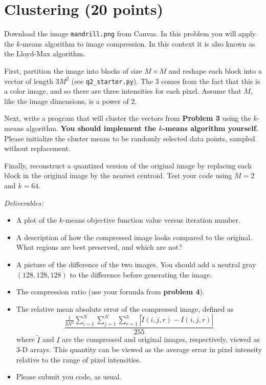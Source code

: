 \section{Clustering (20 points)}

Download the image \texttt{mandrill.png} from Canvas. In this problem you will apply the $k$-means algorithm to image compression. In this context it is also known as the Lloyd-Max algorithm.

\begin{problem}
First, partition the image into blocks of size $M \times M$ and
reshape each block into a vector of length $3M^2$  (see \texttt{q2\_starter.py}). The 3 comes from the fact that this is a color image, and so there are three intensities for each pixel. Assume that $M$, like the image dimensions, is a power of 2.

Next, write a program that will cluster the vectors from \textbf{Problem 3} using the $k$-means algorithm.
\textbf{You should implement the $k$-means algorithm yourself.} Please initialize the cluster means to be randomly selected data points, sampled without replacement.

Finally, reconstruct a quantized version of the original image by
replacing each block in the original image by the nearest centroid. Test your code using $M = 2$ and $k = 64$.

\emph{Deliverables:}
\begin{itemize}
    \item A plot of the $k$-means objective function value versus iteration number.
    \item A description of how the compressed image looks compared to the original. What regions are best preserved, and which are not?
    \item A picture of the difference of the two images. You should add a neutral gray $(128,128,128)$ to the difference before generating the image.
    \item The compression ratio (use your forumla from \textbf{problem 4}).
    \item The
relative mean absolute error of the compressed image, defined as
\[
\frac{\frac{1}{3N^2} \sum_{i=1}^N \sum_{j=1}^N \sum_{r=1}^3 |\tilde{I}(i, j, r) - I(i, j, r)|}{255}
\]
where $\tilde{I}$ and $I$ are the compressed and original images, respectively, viewed as 3-D arrays. This
quantity can be viewed as the average error in pixel intensity relative to the range of
pixel intensities.
    \item Please submit you code, as usual.
\end{itemize}
\end{problem}

